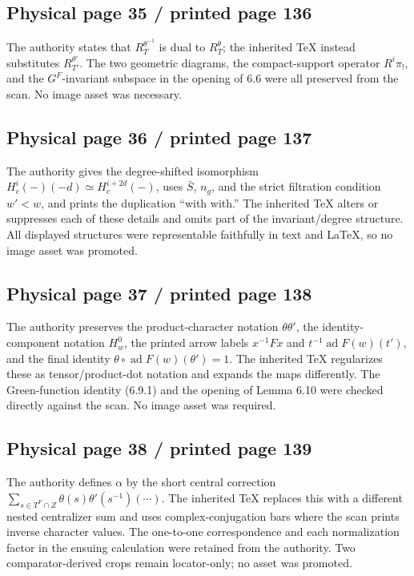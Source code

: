 \documentclass[10pt]{article}
\begin{document}
\subsection*{Physical page 35 / printed page 136}

The authority states that \(R_T^{\theta^{-1}}\) is dual to \(R_T^\theta\); the inherited TeX instead substitutes \(R_{T'}^{\theta'}\). The two geometric diagrams, the compact-support operator \(R^i\pi_!\), and the \(G^F\)-invariant subspace in the opening of 6.6 were all preserved from the scan. No image asset was necessary.\par

\subsection*{Physical page 36 / printed page 137}

The authority gives the degree-shifted isomorphism \(H_c^i(-)(-d)\simeq H_c^{i+2d}(-)\), uses \(\bar S\), \(n_g\), and the strict filtration condition \(w'<w\), and prints the duplication “with with.” The inherited TeX alters or suppresses each of these details and omits part of the invariant/degree structure. All displayed structures were representable faithfully in text and LaTeX, so no image asset was promoted.\par

\subsection*{Physical page 37 / printed page 138}

The authority preserves the product-character notation \(\theta\theta'\), the identity-component notation \(H_w^0\), the printed arrow labels \(x^{-1}Fx\) and \(t^{-1}\operatorname{ad}F(w)(t')\), and the final identity \(\theta\circ\operatorname{ad}F(w)(\theta')=1\). The inherited TeX regularizes these as tensor/product-dot notation and expands the maps differently. The Green-function identity (6.9.1) and the opening of Lemma 6.10 were checked directly against the scan. No image asset was required.\par

\subsection*{Physical page 38 / printed page 139}

The authority defines \(\alpha\) by the short central correction \(\sum_{s\in T^F\cap Z}\theta(s)\theta'(s^{-1})(\cdots)\). The inherited TeX replaces this with a different nested centralizer sum and uses complex-conjugation bars where the scan prints inverse character values. The one-to-one correspondence and each normalization factor in the ensuing calculation were retained from the authority. Two comparator-derived crops remain locator-only; no asset was promoted.\par
\end{document}
